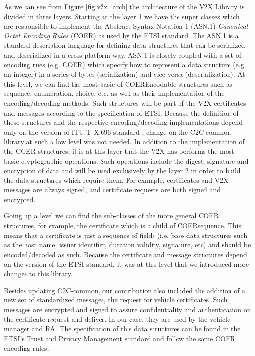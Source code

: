 As we can see from Figure \ref{fig:v2x_arch} the architecture of the V2X Library is divided in three layers. Starting at the layer 1 we have the super classes which are responsible to implement the Abstract Syntax Notation 1 (ASN.1) \textit{Canonical Octet Encoding Rules} (COER) as used by the ETSI standard. The ASN.1 is a standard description language for defining data structures that can be serialized and deserialized in a cross-platform way. ASN.1 is closely coupled with a set of encoding rues (e.g. COER) which specify how to represent a data structure (e.g. an integer) in a series of bytes (serialization) and vice-versa (deserialization). At this level, we can find the most basic of COEREncodable structures such as sequence, enumeration, choice, etc. as well as their implementation of the encoding/decoding methods. Such structures will be part of the V2X certificates and messages according to the specification of ETSI. Because the definition of these structures and the respective encoding/decoding implementations depend only on the version of ITU-T X.696 standard \cite{coer_standard}, change on the C2C-common library at such a low level was not needed. In addition to the implementation of the COER structures, it is at this layer that the V2X has performs the most basic cryptographic operations. Such operations include the digest, signature and encryption of data and will be used exclusively by the layer 2 in order to build the data structures which require them. For example, certificates and V2X messages are always signed, and certificate requests are both signed and encrypted. 

Going up a level we can find the sub-classes of the more general COER structures, for example, the certificate which is a child of COERsequence. This means that a certificate is just a sequence of fields (i.e. base data structures such as the host name, issuer identifier, duration validity, signature, etc) and should be encoded/decoded as such. Because the certificate and message structures depend on the version of the ETSI standard, it was at this level that we introduced more changes to this library. 

Besides updating C2C-common, our contribution also included the addition of a new set of standardized messages, the request for vehicle certificates. Such messages are encrypted and signed to assure confidentiality and authentication on the certificate request and deliver. In our case, they are used by the vehicle manager and RA. The specification of this data structures can be found in the ETSI's Trust and Privacy Management standard \cite{etsi_privacy} and follow the same COER encoding rules. 

